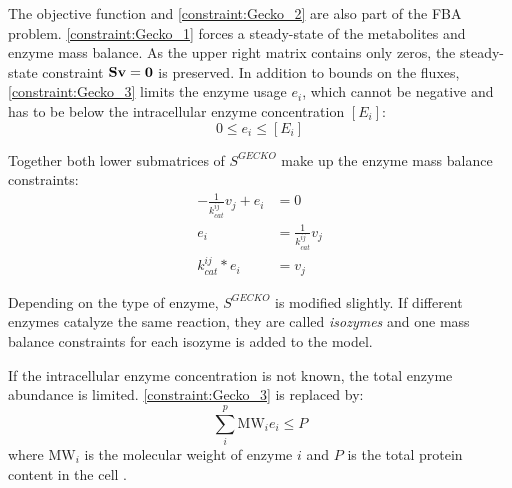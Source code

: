 The objective function and \cref{constraint:Gecko_2} are also part of the FBA problem.
\cref{constraint:Gecko_1} forces a steady-state of the metabolites and enzyme mass balance. As the upper right matrix contains only zeros, the steady-state constraint $\bold S \bold v= \bold 0$ is preserved.
In addition to bounds on the fluxes, \cref{constraint:Gecko_3} limits the enzyme usage $e_i$, which cannot be negative and has to be below the intracellular enzyme concentration $[E_i]$: 
\begin{equation*}
    0 \leq e_i \leq [E_i]    
\end{equation*}

Together both lower submatrices of $S^{GECKO}$ make up the enzyme mass balance constraints: 
\begin{align*}
    -\frac{1}{k_{cat}^{ij}}v_j + e_i &= 0 \\
    e_i &= \frac{1}{k_{cat}^{ij}} v_j \\
    k_{cat}^{ij} * e_i &= v_j
\end{align*}

Depending on the type of enzyme, $S^{GECKO}$ is modified slightly. If different enzymes catalyze the same reaction, they are called \textit{isozymes} and one mass balance constraints for each isozyme is added to the model.

If the intracellular enzyme concentration is not known, the total enzyme abundance is limited.   
\cref{constraint:Gecko_3} is replaced by:
\begin{equation*}
    \sum_i^p \text{MW}_i e_i \leq P
\end{equation*}
\quad where $\text{MW}_i$ is the molecular weight of enzyme $i$ and $P$ is the total protein content in the cell \cite{improving_phenotype_predictions}.